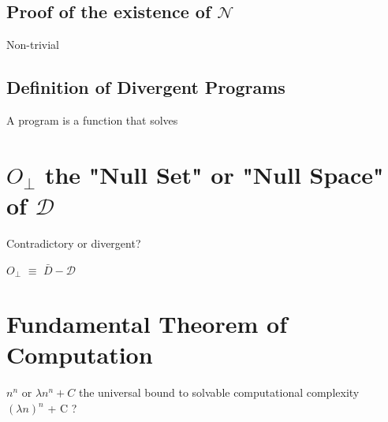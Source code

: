 \documentclass[11pt]{article}
\begin{document}
\subsection{Proof of the existence of $\mathcal{N}$}
Non-trivial


\subsection{Definition of Divergent Programs}
A program is a function that solves

\section{$O_\perp$ the "Null Set" or "Null Space" of $\mathcal{D}$}
Contradictory or divergent?
\begin{center}
$O_\perp$ $\equiv$ $\bar{D} - \mathcal{D}$
\end{center}



\newpage


\section{Fundamental Theorem of Computation}
$n^n$ or $\lambda n^n + C$ the universal bound to solvable computational complexity\\
$(\lambda n)^n$ + C ?\\
\end{document}
